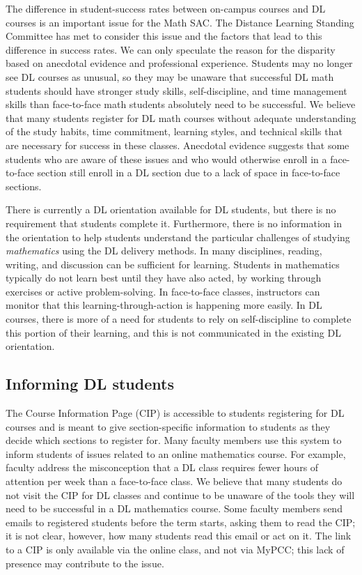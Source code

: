 The difference in student-success rates between on-campus courses and DL courses
is an important issue for the Math SAC.  The Distance Learning Standing
Committee has met to consider this issue and the factors that lead to this
difference in success rates.  We can only speculate the reason for the disparity
based on anecdotal evidence and professional experience.  Students may no longer
see DL courses as unusual, so they may be unaware that successful DL math
students should have stronger study skills, self-discipline, and time management
skills than face-to-face math students absolutely need to be successful. We
believe that many students register for DL math courses without adequate
understanding of the study habits, time commitment, learning styles, and
technical skills that are necessary for success in these classes. Anecdotal
evidence suggests that some students who are aware of these issues and who would
otherwise enroll in a face-to-face section still enroll in a DL section due to a
lack of space in face-to-face sections.

There is currently a DL orientation available for DL students, but there is no
requirement that students complete it. Furthermore, there is no information in
the orientation to help students understand the particular challenges of
studying \emph{mathematics} using the DL delivery methods.  In many disciplines,
reading, writing, and discussion can be sufficient for learning. Students in
mathematics typically do not learn best until they have also acted, by working
through exercises or active problem-solving. In face-to-face classes,
instructors can monitor that this learning-through-action is happening more
easily. In DL courses, there is more of a need for students to rely on
self-discipline to complete this portion of their learning, and this is not
communicated in the existing DL orientation.

\subsection{Informing DL students}
The Course Information Page (CIP) is accessible to students registering for DL
courses and is meant to give section-specific information to students as they
decide which sections to register for.   Many faculty members use this system to
inform students of issues related to an online mathematics course.  For example,
faculty address the misconception that a DL class requires fewer hours of
attention per week than a face-to-face class. We believe that many students do
not visit the CIP for DL classes and continue to be unaware of the tools they
will need to be successful in a DL mathematics course.   Some faculty members
send emails to registered students before the term starts, asking them to read
the CIP;  it is not clear, however, how many students read this email or act on
it.  The link to a CIP is only available via the online class, and not via
MyPCC; this lack of presence may contribute to the issue.

